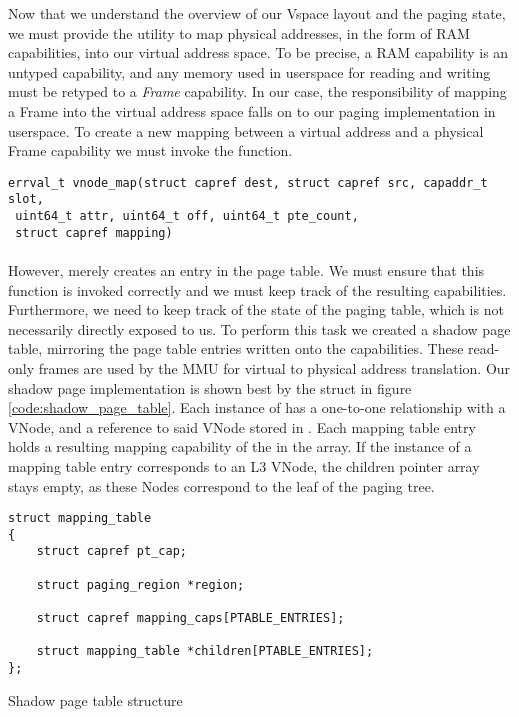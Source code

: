Now that we understand the overview of our Vspace layout and the paging state, we must provide the utility to map physical addresses, in the form of RAM capabilities, into our virtual address space. To be precise, a RAM capability is an untyped capability, and any memory used in userspace for reading and writing must be retyped to a \textit{Frame} capability. In our case, the responsibility of mapping a Frame into the virtual address space falls on to our paging implementation in userspace. To create a new mapping between a virtual address and a physical Frame capability we must invoke the  function. 
\begin{mdframed}[style=myframe]
\begin{verbatim}
errval_t vnode_map(struct capref dest, struct capref src, capaddr_t slot,
 uint64_t attr, uint64_t off, uint64_t pte_count,
 struct capref mapping)
\end{verbatim}
\end{mdframed}

\paragraph{}
However,  merely creates an entry in the page table. We must ensure that this function is invoked correctly and we must keep track of the resulting capabilities. Furthermore, we need to keep track of the state of the paging table, which is not necessarily directly exposed to us. To perform this task we created a shadow page table, mirroring the page table entries written onto the  capabilities. These read-only frames are used by the MMU for virtual to physical address translation. Our shadow page implementation is shown best by the struct in figure \ref{code:shadow_page_table}. Each instance of  has a one-to-one relationship with a VNode, and a reference to said VNode stored in . Each mapping table entry holds a resulting mapping capability of the  in the  array. If the instance of a mapping table entry corresponds to an L3 VNode, the children pointer array stays empty, as these Nodes correspond to the leaf of the paging tree.

\begin{code}
\begin{mdframed}[style=myframe]
\begin{verbatim}
struct mapping_table
{
    struct capref pt_cap;

    struct paging_region *region;

    struct capref mapping_caps[PTABLE_ENTRIES];

    struct mapping_table *children[PTABLE_ENTRIES];
};
\end{verbatim}
\end{mdframed}
\caption{Shadow page table structure}
\newline
\label{code:shadow_page_table}
\end{code}





